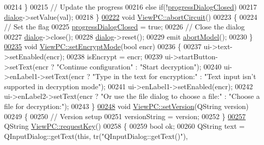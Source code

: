 \begin{DoxyCode}
00214     \}
00215     \textcolor{comment}{// Update the progress}
00216     \textcolor{keywordflow}{else} \textcolor{keywordflow}{if}(!\hyperlink{class_view_p_c_add8c82aa2b0b934212aa5bde9277ab36}{progressDialogClosed})
00217         \hyperlink{class_view_p_c_a31abbb470fe329b44e6ffee202b903ca}{dialog}->setValue(val);
00218 \}
\hypertarget{viewpc_8cpp_source_l00222}{}\hyperlink{class_view_p_c_ad7ba2fcf1d17862de15e32432823f7b0}{00222} \textcolor{keywordtype}{void} \hyperlink{class_view_p_c_ad7ba2fcf1d17862de15e32432823f7b0}{ViewPC::abortCircuit}()
00223 \{
00224     \textcolor{comment}{// Set the flag}
00225     \hyperlink{class_view_p_c_add8c82aa2b0b934212aa5bde9277ab36}{progressDialogClosed} = \textcolor{keyword}{true};
00226     \textcolor{comment}{// Close the dialog}
00227     \hyperlink{class_view_p_c_a31abbb470fe329b44e6ffee202b903ca}{dialog}->close();
00228     \hyperlink{class_view_p_c_a31abbb470fe329b44e6ffee202b903ca}{dialog}->reset();
00229     emit \hyperlink{class_view_p_c_aa652102ce6b5757b8eef830409c8cabf}{abortModel}();
00230 \}
\hypertarget{viewpc_8cpp_source_l00235}{}\hyperlink{class_view_p_c_a5b48951efefdc0e3039c9a4bf185320b}{00235} \textcolor{keywordtype}{void} \hyperlink{class_view_p_c_a5b48951efefdc0e3039c9a4bf185320b}{ViewPC::setEncryptMode}(\textcolor{keywordtype}{bool} encr)
00236 \{
00237     ui->text->setEnabled(encr);
00238     isEncrypt = encr;
00239     ui->startButton->setText(encr ? \textcolor{stringliteral}{"Continue configuration"} : \textcolor{stringliteral}{"Start decryption"});
00240     ui->enLabel1->setText(encr ? \textcolor{stringliteral}{"Type in the text for encryption:"} : \textcolor{stringliteral}{"Text input isn't supported in
       decryption mode"});
00241     ui->enLabel1->setEnabled(encr);
00242     ui->enLabel2->setText(encr ? \textcolor{stringliteral}{"Or use the file dialog to choose a file:"} : \textcolor{stringliteral}{"Choose a file for
       decryption:"});
00243 \}
\hypertarget{viewpc_8cpp_source_l00248}{}\hyperlink{class_view_p_c_ac05220df875b7c4f24405a5742476ebf}{00248} \textcolor{keywordtype}{void} \hyperlink{class_view_p_c_ac05220df875b7c4f24405a5742476ebf}{ViewPC::setVersion}(QString version)
00249 \{
00250     \textcolor{comment}{// Version setup}
00251     versionString = version;
00252 \}
\hypertarget{viewpc_8cpp_source_l00257}{}\hyperlink{class_view_p_c_a559c95675ec98b15451f3bca47033d9c}{00257} QString \hyperlink{class_view_p_c_a559c95675ec98b15451f3bca47033d9c}{ViewPC::requestKey}()
00258 \{
00259     \textcolor{keywordtype}{bool} ok;
00260     QString text = QInputDialog::getText(\textcolor{keyword}{this}, tr(\textcolor{stringliteral}{"QInputDialog::getText()"}),

\end{DoxyCode}
